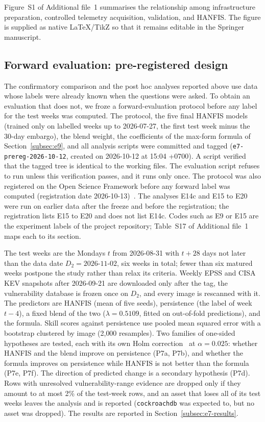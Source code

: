 \documentclass[referee,lineno,pdflatex,sn-basic]{sn-jnl}%
\theoremstyle{thmstyleone}%
\theoremstyle{thmstyletwo}%
\theoremstyle{thmstylethree}%
\begin{document}
Figure~S1 of Additional file~1 summarises the relationship among infrastructure preparation, controlled telemetry acquisition, validation, and HANFIS. The figure is supplied as native \LaTeX/TikZ so that it remains editable in the Springer manuscript.


\subsection{Forward evaluation: pre-registered design}\label{subsec:e7}
The confirmatory comparison and the post hoc analyses reported above use data whose labels were already known when the questions were asked. To obtain an evaluation that does not, we froze a forward-evaluation protocol before any label for the test weeks was computed. The protocol, the five final HANFIS models (trained only on labelled weeks up to 2026-07-27, the first test week minus the 30-day embargo), the blend weight, the coefficients of the max-form formula of Section~\ref{subsec:e9}, and all analysis scripts were committed and tagged (\texttt{e7-prereg-2026-10-12}, created on 2026-10-12 at 15:04 +0700). A script verified that the tagged tree is identical to the working files. The evaluation script refuses to run unless this verification passes, and it runs only once. The protocol was also registered on the Open Science Framework before any forward label was computed (registration date 2026-10-13)~\citep{osf_ahcvs}. The analyses E14c and E15 to E20 were run on earlier data after the freeze and before the registration; the registration lists E15 to E20 and does not list E14c. Codes such as E9 or E15 are the experiment labels of the project repository; Table~S17 of Additional file~1 maps each to its section.

The test weeks are the Mondays $t$ from 2026-08-31 with $t+28$ days not later than the data date $D_2=\text{2026-11-02}$, six weeks in total; fewer than six matured weeks postpone the study rather than relax its criteria. Weekly EPSS and CISA KEV snapshots after 2026-09-21 are downloaded only after the tag, the vulnerability database is frozen once on $D_2$, and every image is rescanned with it. The predictors are HANFIS (mean of five seeds), persistence (the label of week $t-4$), a fixed blend of the two ($\lambda=0.5109$, fitted on out-of-fold predictions), and the formula. Skill scores against persistence use pooled mean squared error with a bootstrap clustered by image (2{,}000 resamples). Two families of one-sided hypotheses are tested, each with its own Holm correction~\citep{holm1979simple} at $\alpha=0.025$: whether HANFIS and the blend improve on persistence (P7a, P7b), and whether the formula improves on persistence while HANFIS is not better than the formula (P7e, P7f). The direction of predicted change is a secondary hypothesis (P7d). Rows with unresolved vulnerability-range evidence are dropped only if they amount to at most 2\% of the test-week rows, and an asset that loses all of its test weeks leaves the analysis and is reported (\texttt{cockroachdb} was expected to, but no asset was dropped). The results are reported in Section~\ref{subsec:e7-results}.
\end{document}

